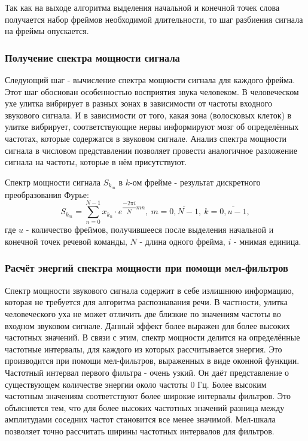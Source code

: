 Так как на выходе алгоритма выделения начальной и конечной точек слова получается набор фреймов необходимой длительности, то шаг разбиения сигнала на фреймы опускается.

\subsubsection{Получение спектра мощности сигнала}
Следующий шаг - вычисление спектра мощности сигнала для каждого фрейма. Этот шаг обоснован особенностью восприятия звука человеком. В человеческом ухе улитка вибрирует в разных зонах в зависимости от частоты входного звукового сигнала. И в зависимости от того, какая зона (волосковых клеток) в улитке вибрирует, соответствующие нервы информируют мозг об определённых частотах, которые содержатся в звуковом сигнале. Анализ спектра мощности сигнала в числовом представлении позволяет провести аналогичное разложение сигнала на частоты, которые в нём присутствуют.

Спектр мощности сигнала $S_{k_m}$ в $k$-ом фрейме - результат дискретного преобразования Фурье:
\begin{equation}
	S_{k_m} = \sum_{n=0}^{N-1} x_{k_n} \cdot e^{\dfrac{-2\pi i}{N}mn},~m=\overline{0,N-1},~k=\overline{0,u-1},
\end{equation}
где $u$ - количество фреймов, получившееся после выделения начальной и конечной точек речевой команды, $N$ - длина одного фрейма, $i$ - мнимая единица.

\subsubsection{Расчёт энергий спектра мощности при помощи мел-фильтров}
Спектр мощности звукового сигнала содержит в себе излишнюю информацию, которая не требуется для алгоритма распознавания речи. В частности, улитка человеческого уха не может отличить две близкие по значениям частоты во входном звуковом сигнале. Данный эффект более выражен для более высоких частотных значений. В связи с этим, спектр мощности делится на определённые частотные интервалы, для каждого из которых рассчитывается энергия. Это производится при помощи мел-фильтров, выраженных в виде оконной функции. Частотный интервал первого фильтра - очень узкий. Он даёт представление о существующем количестве энергии около частоты 0 Гц. Более высоким частотным значениям соответствуют более широкие интервалы фильтров. Это объясняется тем, что для более высоких частотных значений разница между амплитудами соседних частот становится все менее значимой. Мел-шкала позволяет точно рассчитать ширины частотных интервалов для фильтров.

